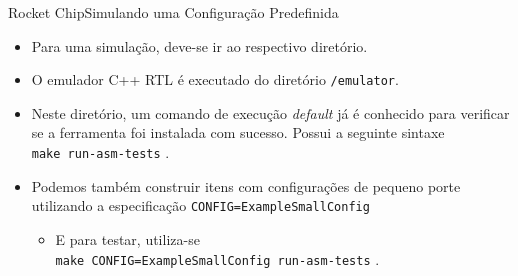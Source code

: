 \documentclass[aspectratio=169, xcolor=dvipsnames]{beamer}
\let\olditem=\item%
\renewcommand{\item}{\olditem \justifying}
\begin{document}
\begin{frame}{Rocket Chip}{Simulando uma Configuração Predefinida}
	\begin{itemize}
		\setlength{\itemsep}{1.5em}
		\item Para uma simulação, deve-se ir ao respectivo diretório.
		
		\item O emulador C++ RTL é executado do diretório \texttt{/emulator}.
		
		\item Neste diretório, um comando de execução \textit{default} já é conhecido para verificar se a ferramenta foi instalada com sucesso. Possui a seguinte sintaxe \\\texttt{make run-asm-tests} .
		
		\item Podemos também construir itens com configurações de pequeno porte utilizando a especificação  \texttt{CONFIG=ExampleSmallConfig} 
		\begin{itemize}
			\item E para testar, utiliza-se \\\texttt{make CONFIG=ExampleSmallConfig run-asm-tests} .
		\end{itemize}
	\end{itemize}
\end{frame}
\end{document}
